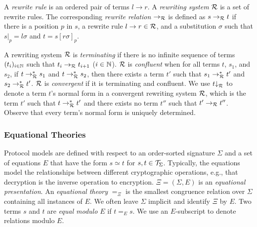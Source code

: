 A \emph{rewrite rule} is an ordered pair of terms $l \to r$.
A \emph{rewriting system} $\R$ is a set of rewrite rules.
The corresponding \emph{rewrite relation} $\to_\R$ is defined as $s \to_\R t$ if there is a position $p$ in $s$, a rewrite rule $l \to r \in \R$, and a substitution $\sigma$ such that $s|_p = l\sigma$ and $t = s[r\sigma]_p$.

A rewriting system $\R$ is \emph{terminating} if there is no infinite sequence of terms $(t_i)_{i \in \nat}$ such that $t_i \to_\R t_{i+1}$ ($i \in \nat$).
$\R$ is \emph{confluent} when for all terms $t$, $s_1$, and $s_2$, if $t \to_\R^* s_1$ and $t \to_\R^* s_2$, then there exists a term $t'$ such that $s_1 \to_\R^* t'$ and $s_2 \to_\R^* t'$.
$\R$ is \emph{convergent} if it is terminating and confluent.
We use $t{\downarrow}_\R$ to denote a term $t$'s normal form in a convergent rewriting system $\R$, which is the term $t'$ such that $t \to_\R^* t'$ and there exists no term $t''$ such that $t' \to_\R t''$.
Observe that every term's normal form is uniquely determined.

\subsubsection{Equational Theories}

Protocol models are defined with respect to an order-sorted signature $\Sigma$ and a set of equations $E$ that have the form $s \simeq t$ for $s, t \in \terms_\Sigma$.
Typically, the equations model the relationships between different cryptographic operations, e.g., that decryption is the inverse operation to encryption.
$\Xi = (\Sigma, E)$ is an \emph{equational presentation}.
An \emph{equational theory} $=_\Xi$ is the smallest congruence relation over $\Sigma$ containing all instances of $E$.
We often leave $\Sigma$ implicit and identify $\Xi$ by $E$.
Two terms $s$ and $t$ are \emph{equal modulo $E$} if $t =_E s$.
We use an $E$-subscript to denote relations modulo $E$.

